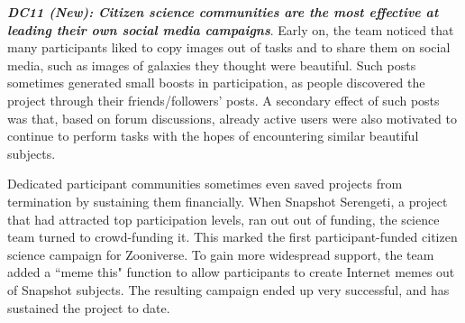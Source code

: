 \documentclass{sigchi}
\begin{document}
\begin{spacing}{0.97}
\textbf{\emph{DC11 (New): Citizen science communities are the most effective at leading their own social media campaigns}}. Early on, the team noticed that many participants liked to copy images out of tasks and to share them on social media, such as images of galaxies they thought were beautiful. Such posts sometimes generated small boosts in participation, as people discovered the project through their friends/followers' posts. A secondary effect of such posts was that, based on forum discussions, already active users were also motivated to continue to perform tasks with the hopes of encountering similar beautiful subjects. 


Dedicated participant communities sometimes even saved projects from termination by sustaining them financially. When Snapshot Serengeti, a project that had attracted top participation levels, ran out out of funding, the science team turned to crowd-funding it. This marked the first participant-funded citizen science campaign for Zooniverse. To gain more widespread support, the team added a ``meme this" function to allow participants to create Internet memes out of Snapshot subjects. The resulting campaign ended up very successful, and has sustained the project to date.


\end{spacing}
\end{document}

